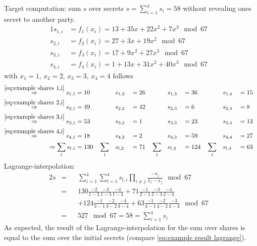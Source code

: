 		\noindent Target computation: sum $s$ over secrets $s= \sum_{i=1}^4 s_i=58$ without revealing ones secret to another party.		
		\begin{alignat}{1}
			s_{1,i}&=f_1(x_i)=13 + 35x + 22x^2 + 7x^3 \mod 67 \label{eq:example shares 1,i} \\
			s_{2,i}&=f_2(x_i)=27 + 3x + 19x^2 \mod 67 \label{eq:example shares 2,i} \\
			s_{3,i}&=f_3(x_i)=17 + 9x^2 + 27x^3 \mod 67 \label{eq:example shares 3,i} \\
			s_{4,i}&=f_4(x_i)=1 + 13x + 31x^2 + 40x^3 \mod 67 \label{eq:example shares 4,i}
		\end{alignat}
		with $x_1=1$, $x_2=2$, $x_3=3$, $x_4=4$ follows
		\begin{alignat}{7}
		 \overset{\ref{eq:example shares 1,i}}{\Rightarrow} s_{1,1}&=10 \quad &&s_{1,2}&&=26 \quad &&s_{1,3}&&=36 \quad  &&s_{1,4}&&=15  \nonumber \\
		\overset{\ref{eq:example shares 2,i}}{\Rightarrow} s_{2,1}&=49 \quad &&s_{2,2}&&=42 \quad &&s_{2,3}&&=6 \quad &&s_{2,4}&&=8  \nonumber \\
		\overset{\ref{eq:example shares 3,i}}{\Rightarrow} s_{3,1}&=53 \quad &&s_{3,2}&&=1 \quad &&s_{3,3}&&=23 \quad &&s_{3,4}&&=13  \nonumber \\
		\overset{\ref{eq:example shares 4,i}}{\Rightarrow} s_{4,1}&=18 \quad &&s_{4,2}&&=2 \quad &&s_{4,3}&&=59 \quad &&s_{4,4}&&=27 \nonumber \\
		\Rightarrow \sum_l s_{l,1}&=130 \quad \sum_l && s_{l,2}&&=71 \quad \sum_l && s_{l,3}&&=124 \quad \sum_l && s_{l,4}&&=63 \nonumber		
		\end{alignat}
		Lagrange-interpolation:
		\begin{alignat}{2}
		s&= &&\sum_{i=1}^{4}\sum_{l=1}^{4}s_{l,i}\prod_{i \neq j} \frac{-x_j}{x_i-x_j}\mod 67 \nonumber \\
		 &= &&130\frac{-2}{1-2}\frac{-3}{1-3}\frac{-4}{1-4}+71\frac{-1}{2-1}\frac{-3}{2-3}\frac{-4}{2-4} \nonumber \\
		 & &&+124\frac{-1}{3-1}\frac{-2}{3-2}\frac{-4}{3-4}+63\frac{-1}{4-1}\frac{-2}{4-2}\frac{-3}{4-3}\mod 67 \nonumber \\
		 &=&& 527 \mod 67 = 58 = \sum_{i=1}^4 s_i \label{eq:example result lagrange}
		\end{alignat}
		As expected, the result of the Lagrange-interpolation for the sum over shares is equal to the sum over the initial secrets (compare \ref{eq:example result lagrange}).
		
